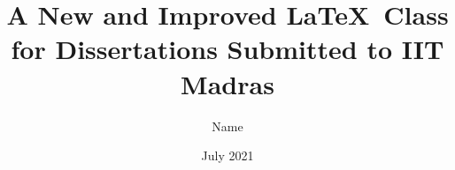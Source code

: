 
\title{A New and Improved \LaTeX\ Class for Dissertations Submitted to IIT Madras}

\author{Name}

\date{July 2021}


\maketitle
\restoregeometry

\clearpage \mbox{} \thispagestyle{empty} \clearpage